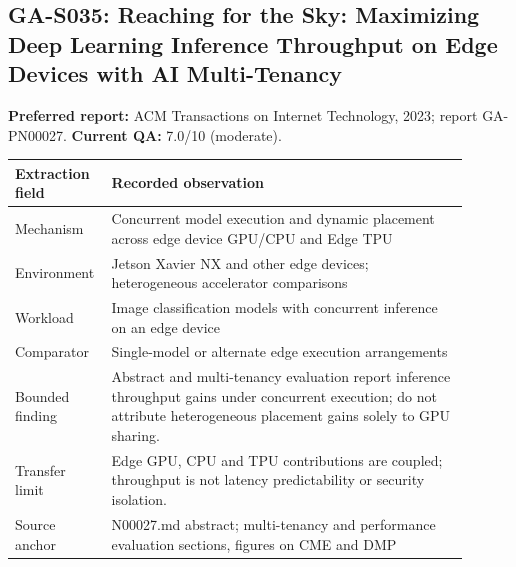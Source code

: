 \subsection{GA-S035: Reaching for the Sky: Maximizing Deep Learning Inference Throughput on Edge Devices with AI Multi-Tenancy}
\textbf{Preferred report:} ACM Transactions on Internet Technology, 2023; report GA-PN00027. \textbf{Current QA:} 7.0/10 (moderate).
\begin{longtable}{P{0.15\linewidth}P{0.75\linewidth}}
\toprule Extraction field & Recorded observation\\\midrule\endhead
Mechanism & Concurrent model execution and dynamic placement across edge device GPU/CPU and Edge TPU\\
Environment & Jetson Xavier NX and other edge devices; heterogeneous accelerator comparisons\\
Workload & Image classification models with concurrent inference on an edge device\\
Comparator & Single-model or alternate edge execution arrangements\\
Bounded finding & Abstract and multi-tenancy evaluation report inference throughput gains under concurrent execution; do not attribute heterogeneous placement gains solely to GPU sharing.\\
Transfer limit & Edge GPU, CPU and TPU contributions are coupled; throughput is not latency predictability or security isolation.\\
Source anchor & N00027.md abstract; multi-tenancy and performance evaluation sections, figures on CME and DMP\\
\bottomrule\end{longtable}
